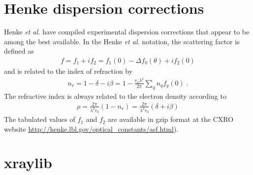 \documentclass[11pt]{article}
\begin{document}
\section{Henke dispersion corrections} 

Henke {\itshape et al.}\cite{henkeXRayInteractionsPhotoabsorption1993} have compiled experimental dispersion corrections
that appear to be among the best available.  
In the Henke {\itshape et al.}\cite{henkeXRayInteractionsPhotoabsorption1993} notation, the scattering factor is defined
as
\begin{align}
f=f_1+if_2=f_1(0)-\Delta f_0(\theta)+if_2(0)
\end{align}
and is related to the index of refraction by
\begin{align}
n_r = 1 - \delta -i\beta = 1 -\frac{r_0\lambda^2}{2\pi}\sum_q n_qf_q(0) \; .
\end{align}
The refractive index is always related to the electron density according to
\begin{align}
\rho =  \frac{2\pi}{\lambda^2 r_0 } \left( 1 - n_r \right) = \frac{2\pi}{\lambda^2 r_0 } \left( \delta + i \beta \right) 
\end{align}
The tabulated values of $f_1$ and $f_2$ are available in gzip format at the CXRO website
\url{http://henke.lbl.gov/optical_constants/asf.html}).  %


\section{xraylib}
\end{document}
